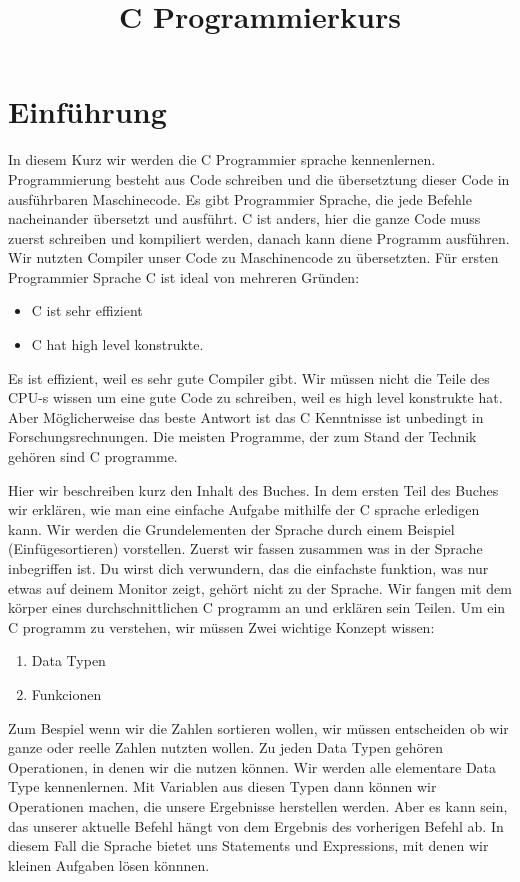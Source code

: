 \documentclass{article}[12pt]
\title{C Programmierkurs}
\begin{document}
\maketitle
\section{Einführung}
In diesem Kurz wir werden die C Programmier sprache kennenlernen. Programmierung besteht aus Code schreiben und die übersetztung dieser Code in
ausführbaren Maschinecode.
Es gibt Programmier Sprache, die jede Befehle nacheinander übersetzt und ausführt. C ist anders, hier die ganze Code muss zuerst schreiben und
kompiliert werden,  danach kann diene Programm ausführen. Wir nutzten Compiler unser Code zu Maschinencode zu übersetzten. Für ersten Programmier Sprache C ist ideal 
von mehreren Gründen:
\begin{itemize}
\item C ist sehr effizient
\item C hat high level konstrukte.
\end{itemize}
Es ist effizient, weil es sehr gute Compiler gibt. Wir müssen nicht die Teile des CPU-s wissen um eine gute Code zu schreiben, 
weil es high level konstrukte hat. Aber M\"oglicherweise das beste Antwort ist das C Kenntnisse ist unbedingt in Forschungsrechnungen. Die meisten Programme,
der zum Stand der Technik geh\"oren sind C programme. 


Hier wir beschreiben kurz den Inhalt des Buches. In dem ersten Teil des Buches wir erklären, wie man eine einfache Aufgabe mithilfe der C
sprache erledigen kann. Wir werden die Grundelementen der Sprache durch einem Beispiel (Einfügesortieren) vorstellen. Zuerst wir fassen
zusammen was in der Sprache inbegriffen ist. Du wirst dich verwundern, das die einfachste funktion, was nur etwas auf deinem Monitor zeigt, 
geh\"ort nicht zu der Sprache. Wir fangen mit dem k\"orper eines durchschnittlichen C programm an  und erkl\"aren sein Teilen.
Um ein C programm zu verstehen, wir müssen Zwei wichtige Konzept wissen:
\begin{enumerate}
\item Data Typen
\item Funkcionen
\end{enumerate}

Zum Bespiel wenn wir die Zahlen sortieren wollen, wir müssen entscheiden ob wir ganze oder reelle Zahlen nutzten wollen. Zu jeden Data 
Typen gehören Operationen, in denen wir die nutzen k\"onnen. Wir werden alle elementare Data Type kennenlernen. Mit Variablen aus diesen 
Typen dann k\"onnen wir Operationen machen, die unsere Ergebnisse herstellen werden. Aber es kann sein, das unserer aktuelle Befehl hängt
von dem Ergebnis des vorherigen Befehl ab. In diesem Fall die Sprache bietet uns Statements und Expressions, mit denen wir kleinen Aufgaben 
lösen könnnen.
\end{document}
